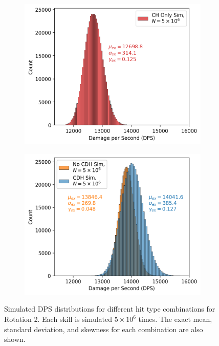 \documentclass{article}
\begin{document}
        \begin{figure}[H]
            \begin{subfigure}[b]{0.49\textwidth}
                \centering
                \includegraphics[width=\textwidth]{img/rotation-2-CH.PNG}
            \end{subfigure}
            \hfill
            \begin{subfigure}[b]{0.49\textwidth}
                \centering
                \includegraphics[width=\textwidth]{img/rotation-2.PNG}
            \end{subfigure}
            \caption{Simulated DPS distributions for different hit type combinations for Rotation 2. Each skill is simulated $5 \times 10^6$ times. The exact mean, standard deviation, and skewness for each combination are also shown.}\label{fig:rot-2}
        \end{figure}
\end{document}
